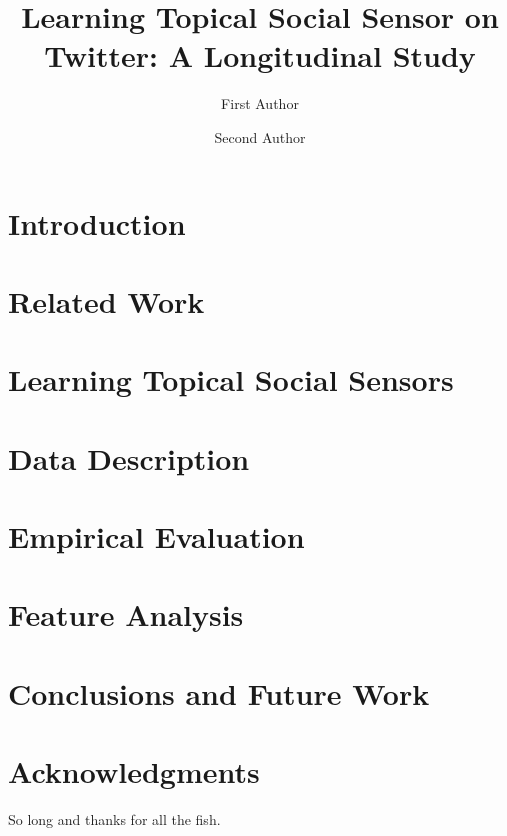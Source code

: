\documentclass[fleqn,10pt,lineno]{wlpeerj} %
\title{Learning Topical Social Sensor on Twitter: A Longitudinal Study}
\author[1]{First Author}
\author[2]{Second Author}
\affil[1]{Address of first author}
\affil[2]{Address of second author}
\begin{document}
\flushbottom
\maketitle
\thispagestyle{empty}

\section*{Introduction}


%
%

\section*{Related Work}


\section*{Learning Topical Social Sensors}
\label{sec:lss}


\section*{Data Description}
\label{sec:datasetStatistics}


\section*{Empirical Evaluation}
\label{sec:methodology}


\section*{Feature Analysis}
\label{label:featureanalysis}


\section*{Conclusions and Future Work}


\section*{Acknowledgments}

So long and thanks for all the fish.


\end{document}
